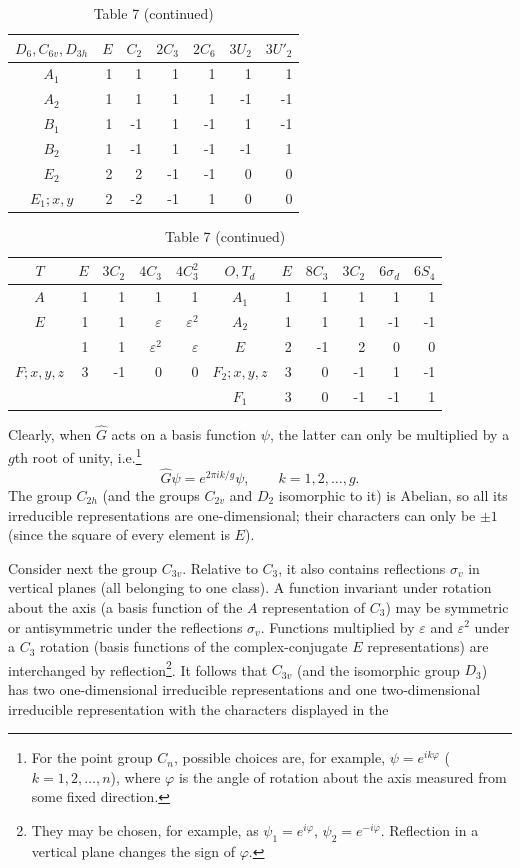 \begin{table}[p]\centering\small
\caption*{Table 7 (continued)}
\begin{tabular}{c|rrrrrr}
$D_6,C_{6v},D_{3h}$&$E$&$C_2$&$2C_3$&$2C_6$&$3U_2$&$3U'_2$\\\hline
$A_1$&1&1&1&1&1&1\\ $A_2$&1&1&1&1&-1&-1\\
$B_1$&1&-1&1&-1&1&-1\\ $B_2$&1&-1&1&-1&-1&1\\
$E_2$&2&2&-1&-1&0&0\\ $E_1;x,y$&2&-2&-1&1&0&0
\end{tabular}

\medskip
\begin{tabular}{c|rrrr|c|rrrrr}
$T$&$E$&$3C_2$&$4C_3$&$4C_3^2$&$O,T_d$&$E$&$8C_3$&$3C_2$&$6\sigma_d$&$6S_4$\\\hline
$A$&1&1&1&1&$A_1$&1&1&1&1&1\\
$E$&1&1&$\varepsilon$&$\varepsilon^2$&$A_2$&1&1&1&-1&-1\\
&1&1&$\varepsilon^2$&$\varepsilon$&$E$&2&-1&2&0&0\\
$F;x,y,z$&3&-1&0&0&$F_2;x,y,z$&3&0&-1&1&-1\\
&&&&&$F_1$&3&0&-1&-1&1
\end{tabular}
\end{table}

Clearly, when $\widehat G$ acts on a basis function $\psi$, the latter can only be multiplied by a $g$th root of unity, i.e.\footnote{For the point group $C_n$, possible choices are, for example, $\psi=e^{ik\varphi}$ ($k=1,2,\ldots,n$), where $\varphi$ is the angle of rotation about the axis measured from some fixed direction.}
\[
\widehat G\psi=e^{2\pi ik/g}\psi,\qquad k=1,2,\ldots,g.
\]
The group $C_{2h}$ (and the groups $C_{2v}$ and $D_2$ isomorphic to it) is Abelian, so all its irreducible representations are one-dimensional; their characters can only be $\pm1$ (since the square of every element is $E$).

Consider next the group $C_{3v}$. Relative to $C_3$, it also contains reflections $\sigma_v$ in vertical planes (all belonging to one class). A function invariant under rotation about the axis (a basis function of the $A$ representation of $C_3$) may be symmetric or antisymmetric under the reflections $\sigma_v$. Functions multiplied by $\varepsilon$ and $\varepsilon^2$ under a $C_3$ rotation (basis functions of the complex-conjugate $E$ representations) are interchanged by reflection\footnote{They may be chosen, for example, as $\psi_1=e^{i\varphi}$, $\psi_2=e^{-i\varphi}$. Reflection in a vertical plane changes the sign of $\varphi$.}. It follows that $C_{3v}$ (and the isomorphic group $D_3$) has two one-dimensional irreducible representations and one two-dimensional irreducible representation with the characters displayed in the

